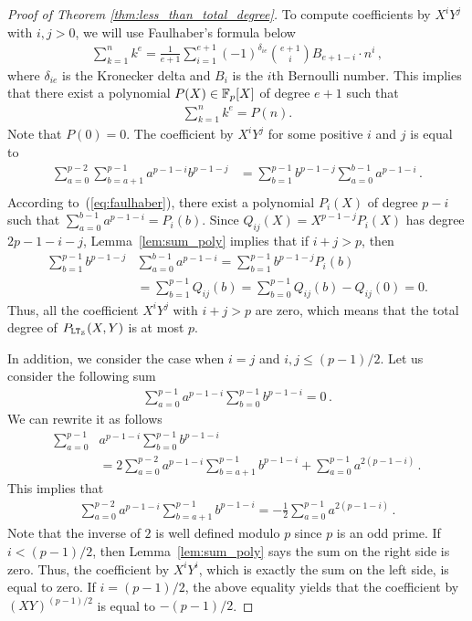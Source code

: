 \begin{proof}[Proof of Theorem \ref{thm:less_than_total_degree}]
    To compute coefficients by $X^i Y^j$ with $i, j > 0$, we will use Faulhaber's formula below
    \begin{align*}
      \sum_{k=1}^n k^e = \frac{1}{e+1} \sum_{i=1}^{e+1} (-1)^{\delta_{ie}} \binom{e+1}{i} B_{e+1-i} \cdot n^i\,,
    \end{align*}
    where $\delta_{ie}$ is the Kronecker delta and $B_{i}$ is the $i$th Bernoulli number.
    This implies that there exist a polynomial $P(X) \in \mathbb{F}_p[X]$ of degree $e+1$ such that
    \begin{align}\label{eq:faulhaber}
      \sum_{k=1}^n k^e = P(n).
    \end{align}
    Note that $P(0) = 0$.
    The coefficient by $X^i Y^j$ for some positive $i$ and $j$ is equal to
    \begin{align*}
      \sum_{a = 0}^{p-2} \sum_{b=a+1}^{p-1} a^{p-1-i} b^{p-1-j} &= \sum_{b = 1}^{p-1} b^{p-1-j} \sum_{a=0}^{b-1} a^{p-1-i}\,. \\
    \end{align*}
    According to~(\ref{eq:faulhaber}), there exist a polynomial $P_i(X)$ of degree $p-i$ such that $\sum_{a=0}^{b-1} a^{p-1-i} = P_i(b)$.
    Since $Q_{ij}(X) = X^{p-1-j} P_i(X)$ has degree $2p-1-i-j$, Lemma~\ref{lem:sum_poly} implies that if $i+j > p$, then
    \begin{align*}
      \sum_{b = 1}^{p-1} b^{p-1-j} &\sum_{a=0}^{b-1} a^{p-1-i} = \sum_{b = 1}^{p-1} b^{p-1-j} P_i(b) \\ 
      &= \sum_{b=1}^{p-1} Q_{ij}(b) = \sum_{b=0}^{p-1} Q_{ij}(b) - Q_{ij}(0) = 0.
    \end{align*}
    Thus, all the coefficient $X^i Y^j$ with $i + j > p$ are zero, which means that the total degree of $P_{\mathtt{LT}_{\mathcal{S}}}(X,Y)$ is at most $p$.

    In addition, we consider the case when $i = j$ and $i,j \le (p-1)/2$.
    Let us consider the following sum
    \begin{align*}
      \sum_{a=0}^{p-1} a^{p-1-i} \sum_{b=0}^{p-1} b^{p-1-i} = 0\,.
    \end{align*}
    We can rewrite it as follows
    \begin{align*}
      \sum_{a=0}^{p-1} & a^{p-1-i} \sum_{b=0}^{p-1} b^{p-1-i} \\
      &= 2\sum_{a=0}^{p-2} a^{p-1-i} \sum_{b=a+1}^{p-1} b^{p-1-i} + \sum_{a=0}^{p-1} a^{2(p-1-i)}\,.
    \end{align*}
    This implies that
    \begin{align*}
      \sum_{a=0}^{p-2} a^{p-1-i} \sum_{b=a+1}^{p-1} b^{p-1-i} = -\frac{1}{2}\sum_{a=0}^{p-1} a^{2(p-1-i)}\,.
    \end{align*}
    Note that the inverse of $2$ is well defined modulo $p$ since $p$ is an odd prime.
    If $i < (p-1)/2$, then Lemma~\ref{lem:sum_poly} says the sum on the right side is zero.
    Thus, the coefficient by $X^i Y^i$, which is exactly the sum on the left side, is equal to zero.
    If $i = (p-1)/2$, the above equality yields that the coefficient by $(XY)^{(p-1)/2}$ is equal to $-(p-1)/2$.
  \end{proof}

